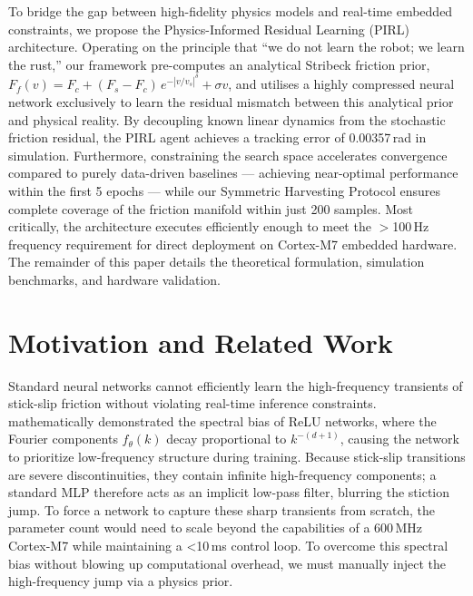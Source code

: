 \documentclass[11pt, a4paper]{article}
\begin{document}
To bridge the gap between high-fidelity physics models and real-time
embedded constraints, we propose the Physics-Informed Residual Learning
(PIRL) architecture.
Operating on the principle that ``we do not learn the robot; we learn the
rust,'' our framework pre-computes an analytical Stribeck friction prior,
$F_f(v) = F_c + (F_s - F_c)\,e^{-|v/v_s|^\delta} + \sigma v$, and
utilises a highly compressed neural network exclusively to learn the
residual mismatch between this analytical prior and physical reality.
By decoupling known linear dynamics from the stochastic friction residual,
the PIRL agent achieves a tracking error of 0.00357\,rad in simulation.
Furthermore, constraining the search space accelerates convergence compared
to purely data-driven baselines --- achieving near-optimal performance
within the first 5 epochs --- while our Symmetric Harvesting Protocol
ensures complete coverage of the friction manifold within just 200 samples.
Most critically, the architecture executes efficiently enough to meet the
$>$100\,Hz frequency requirement for direct deployment on Cortex-M7
embedded hardware.
The remainder of this paper details the theoretical formulation, simulation
benchmarks, and hardware validation.

\section{Motivation and Related Work}

Standard neural networks cannot efficiently learn the high-frequency
transients of stick-slip friction without violating real-time inference
constraints.
\citet{rahaman2019spectralbiasneuralnetworks} mathematically demonstrated
the spectral bias of ReLU networks, where the Fourier components
$f_{\theta}(k)$ decay proportional to $k^{-(d+1)}$, causing the network
to prioritize low-frequency structure during training.
Because stick-slip transitions are severe discontinuities, they contain
infinite high-frequency components; a standard MLP therefore acts as an
implicit low-pass filter, blurring the stiction jump.
To force a network to capture these sharp transients from scratch, the
parameter count would need to scale beyond the capabilities of a
600\,MHz Cortex-M7 while maintaining a \textless10\,ms control loop.
To overcome this spectral bias without blowing up computational overhead,
we must manually inject the high-frequency jump via a physics prior.
\end{document}
